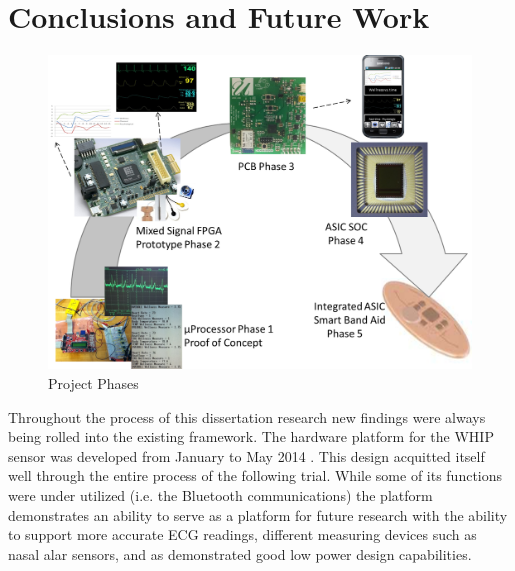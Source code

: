 \chapter{Conclusions and Future Work}
\label{chap:conclusions}

\begin{figure}
\centering
\includegraphics[width=0.7\linewidth]{Images/projectPhases}
\caption{Project Phases}
\label{fig:projectPhases}
\end{figure}


Throughout the process of this dissertation research new findings were always being rolled into the existing framework. The hardware platform for the WHIP sensor was developed from January to May 2014 . This design acquitted itself well through the entire process of the following trial. While some of its functions were under utilized (i.e. the Bluetooth communications) the platform demonstrates an ability to serve as a platform for future research with the ability to support more accurate ECG readings, different  measuring devices such as nasal alar sensors, and as demonstrated good low power design capabilities. 

